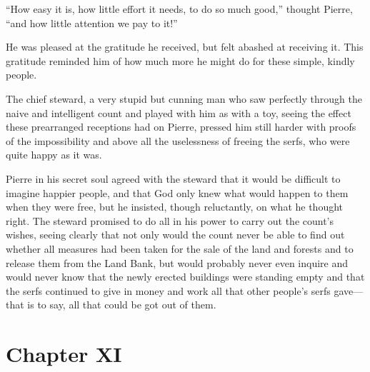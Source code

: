 ``How easy it is, how little effort it needs, to do so much
good,'' thought Pierre, ``and how little attention we pay to
it!''

He was pleased at the gratitude he received, but felt abashed at
receiving it. This gratitude reminded him of how much more he
might do for these simple, kindly people.

The chief steward, a very stupid but cunning man who saw
perfectly through the naive and intelligent count and played with
him as with a toy, seeing the effect these prearranged receptions
had on Pierre, pressed him still harder with proofs of the
impossibility and above all the uselessness of freeing the serfs,
who were quite happy as it was.

Pierre in his secret soul agreed with the steward that it would
be difficult to imagine happier people, and that God only knew
what would happen to them when they were free, but he insisted,
though reluctantly, on what he thought right. The steward
promised to do all in his power to carry out the count's wishes,
seeing clearly that not only would the count never be able to
find out whether all measures had been taken for the sale of the
land and forests and to release them from the Land Bank, but
would probably never even inquire and would never know that the
newly erected buildings were standing empty and that the serfs
continued to give in money and work all that other people's serfs
gave---that is to say, all that could be got out of them.


\chapter*{Chapter XI}
\ifaudio     
{} 
\fi

